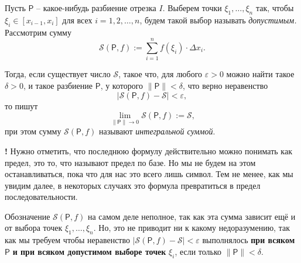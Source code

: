 \begin{definition}\label{def_of_Rieman_via_lim}
    Пусть $\mathsf{P}$ -- какое-нибудь разбиение отрезка $I$. Выберем точки $\xi_1,\ldots, \xi_n$ так, чтобы $\xi_i \in [x_{i-1},x_i]$ для всех $i =1,2,\ldots, n$, будем такой выбор называть \textit{допустимым.} Рассмотрим сумму
    \[
     \mathcal{S}(\mathsf{P}, f):= \sum_{i=1}^n f(\xi_i)\cdot \Delta x_i.
    \]

Тогда, если существует число $\mathcal{S}$, такое что, для любого $\varepsilon>0$ можно найти такое $\delta >0$, и такое разбиение $\mathsf{P}$, у которого $\| \mathsf{P}\| <\delta$, что верно неравенство
\[
 \left| \mathcal{S}(\mathsf{P}, f) - \mathcal{S} \right|<\varepsilon,
\]
то пишут
\[
 \lim_{\|\mathsf{P}\| \to 0} \mathcal{S}(\mathsf{P},f) :=\mathcal{S},
\]
при этом сумму $\mathcal{S}(\mathsf{P},f)$ называют \textit{интегральной суммой}.
\end{definition}

\begin{mydangerr}{\bf !}
    Нужно отметить, что последнюю формулу действительно можно понимать как предел, это то, что называют предел по базе. Но мы не будем на этом останавливаться, пока что для нас это всего лишь символ. Тем не менее, как мы увидим далее, в некоторых случаях это формула превратиться в предел последовательности.
\end{mydangerr}

\begin{remark}
    Обозначение $\mathcal{S}(\mathsf{P}, f)$ на самом деле неполное, так как эта сумма зависит ещё и от выбора точек $\xi_1,\ldots, \xi_n$. Но, это не приводит ни к какому недоразумению, так как мы требуем чтобы неравенство $\left| \mathcal{S}(\mathsf{P}, f) - \mathcal{S} \right|<\varepsilon$ выполнялось \textbf{при всяком} $\mathsf{P}$ \textbf{и при всяком допустимом выборе точек} $\xi_i$, если только $\| \mathsf{P}\| < \delta.$
\end{remark}

